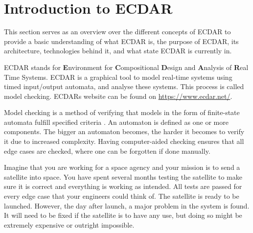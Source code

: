 \section{Introduction to ECDAR}\label{sec:introduction-to-ecdar}
\commondisclaimer

This section serves as an overview over the different concepts of ECDAR to provide a basic understanding of what ECDAR is, the purpose of ECDAR, its architecture, technologies behind it, and what state ECDAR is currently in.

ECDAR stands for \textbf{E}nvironment for \textbf{C}ompositional \textbf{D}esign and \textbf{A}nalysis of \textbf{R}eal Time Systems.
ECDAR is a graphical tool to model real-time systems using timed input/output automata, and analyse these systems. 
This process is called model checking. ECDARs website can be found on \href{https://www.ecdar.net/}{https://www.ecdar.net/}.

Model checking is a method of verifying that models in the form of finite-state automata fulfill specified criteria \cite{modelchecking-handbook}.
An automaton is defined as one or more components.
The bigger an automaton becomes, the harder it becomes to verify it due to increased complexity. 
Having computer-aided checking ensures that all edge cases are checked, where one can be forgotten if done manually.
 

Imagine that you are working for a space agency and your mission is to send a satellite into space.
You have spent several months testing the satellite to make sure it is correct and everything is working as intended.
All tests are passed for every edge case that your engineers could think of.
The satellite is ready to be launched.
However, the day after launch, a major problem in the system is found. 
It will need to be fixed if the satellite is to have any use, but doing so might be extremely expensive or outright impossible.

